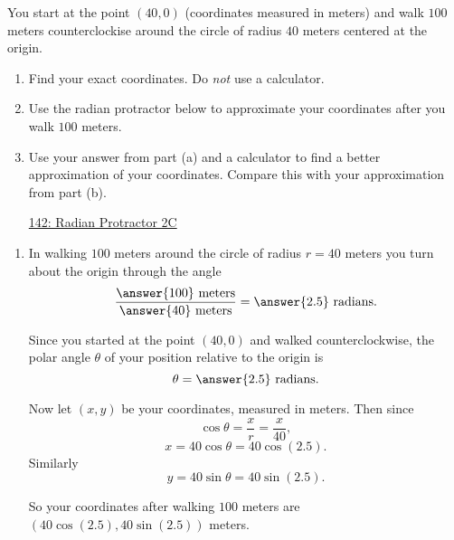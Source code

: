 \documentclass{ximera}
\begin{document}
\begin{example}  \label{Exp8948394444}

You start at the point $(40,0)$ (coordinates measured in meters) and walk $100$ meters counterclockise around the circle of radius $40$ meters centered at the origin.

\begin{enumerate}

\item Find your exact coordinates. Do \emph{not} use a calculator.

\item Use the radian protractor below to approximate your coordinates after you walk $100$ meters.
 
\item Use your answer from part (a) and a calculator to find a better approximation of your coordinates. Compare this with your approximation from part (b).

\begin{onlineOnly}
    \begin{center}
\end{center}
\end{onlineOnly}

\href{https://www.desmos.com/calculator/lbkveixdno}{142: Radian Protractor 2C}

\end{enumerate}

\begin{explanation}

\begin{enumerate}
\item In walking $100$ meters around the circle of radius $r = 40$ meters you turn about the origin through the angle
\[
   \frac{\answer{100}\text{ meters}}{\answer{40}\text{ meters}} = \answer{2.5}\text{ radians} .
\]

Since  you started at the point $(40,0)$ and walked counterclockwise, the polar angle $\theta$ of your position relative to the origin is
\[
 \theta =  \answer{2.5} \text{ radians} .
\]

Now let $(x,y)$ be your coordinates, measured in meters. Then since
\[
 \cos \theta = \frac{x}{r} = \frac{x}{40} ,  %
\]
\[
  x = 40 \cos\theta = 40 \cos (2.5) .
\]
Similarly
\[
   y = 40 \sin\theta = 40 \sin (2.5) .
\]

So your coordinates after walking $100$ meters are $(40 \cos (2.5) , 40\sin(2.5))$ meters.


\end{enumerate}
\end{explanation}
\end{example}
\end{document}

